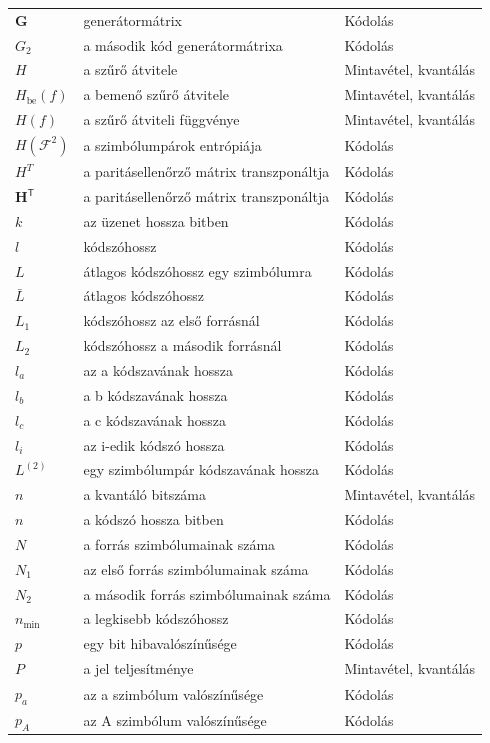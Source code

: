 {\begin{longtable}{@{}>{\raggedright\arraybackslash}p{2.4cm}>{\raggedright\arraybackslash}p{8.2cm}>{\raggedright\arraybackslash}p{3.8cm}@{}}
$\mathbf G$ & generátormátrix & Kódolás\\
$G_2$ & a második kód generátormátrixa & Kódolás\\
$H$ & a szűrő átvitele & Mintavétel, kvantálás\\
$H_\text{be}(f)$ & a bemenő szűrő átvitele & Mintavétel, kvantálás\\
$H(f)$ & a szűrő átviteli függvénye & Mintavétel, kvantálás\\
$H(\mathcal F^2)$ & a szimbólumpárok entrópiája & Kódolás\\
$H^T$ & a paritásellenőrző mátrix transzponáltja & Kódolás\\
$\mathbf H^{\mathsf T}$ & a paritásellenőrző mátrix transzponáltja & Kódolás\\
$k$ & az üzenet hossza bitben & Kódolás\\
$l$ & kódszóhossz & Kódolás\\
$L$ & átlagos kódszóhossz egy szimbólumra & Kódolás\\
$\bar L$ & átlagos kódszóhossz & Kódolás\\
$L_1$ & kódszóhossz az első forrásnál & Kódolás\\
$L_2$ & kódszóhossz a második forrásnál & Kódolás\\
$l_a$ & az a kódszavának hossza & Kódolás\\
$l_b$ & a b kódszavának hossza & Kódolás\\
$l_c$ & a c kódszavának hossza & Kódolás\\
$l_i$ & az i-edik kódszó hossza & Kódolás\\
$L^{(2)}$ & egy szimbólumpár kódszavának hossza & Kódolás\\
$n$ & a kvantáló bitszáma & Mintavétel, kvantálás\\
$n$ & a kódszó hossza bitben & Kódolás\\
$N$ & a forrás szimbólumainak száma & Kódolás\\
$N_1$ & az első forrás szimbólumainak száma & Kódolás\\
$N_2$ & a második forrás szimbólumainak száma & Kódolás\\
$n_{\min}$ & a legkisebb kódszóhossz & Kódolás\\
$p$ & egy bit hibavalószínűsége & Kódolás\\
$P$ & a jel teljesítménye & Mintavétel, kvantálás\\
$p_a$ & az a szimbólum valószínűsége & Kódolás\\
$p_A$ & az A szimbólum valószínűsége & Kódolás\\

\end{longtable}}
